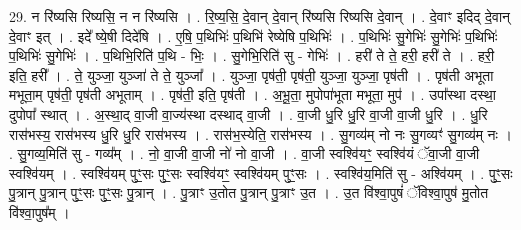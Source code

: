\documentclass[17pt]{extarticle}
\begin{document}
29. न रि॑ष्यसि रिष्यसि॒ न न रि॑ष्यसि । . रि॒ष्य॒सि॒ दे॒वान् दे॒वान् रि॑ष्यसि रिष्यसि दे॒वान् । . दे॒वाꣳ इदिद् दे॒वान् दे॒वाꣳ इत् । . इदे᳚ ष्ये॒षी दिदे॑षि । . ए॒षि॒ प॒थिभिः॑ प॒थिभि॑ रेष्येषि प॒थिभिः॑ । . प॒थिभिः॑ सु॒गेभिः॑ सु॒गेभिः॑ प॒थिभिः॑ प॒थिभिः॑ सु॒गेभिः॑ । . प॒थिभि॒रिति॑ प॒थि - भिः॒ । . सु॒गेभि॒रिति॑ सु - गेभिः॑ । . हरी॑ ते ते॒ हरी॒ हरी॑ ते । . हरी॒ इति॒ हरी᳚ । . ते॒ युञ्जा॒ युञ्जा॑ ते ते॒ युञ्जा᳚ । . युञ्जा॒ पृष॑ती॒ पृष॑ती॒ युञ्जा॒ युञ्जा॒ पृष॑ती । . पृष॑ती अभूता मभूता॒म् पृष॑ती॒ पृष॑ती अभूताम् । . पृष॑ती॒ इति॒ पृष॑ती । . अ॒भू॒ता॒ मुपोपा॑भूता मभूता॒ मुप॑ । . उपा᳚स्था दस्था॒ दुपोपा᳚ स्थात् । . अ॒स्था॒द् वा॒जी वा॒ज्य॑स्था दस्थाद् वा॒जी । . वा॒जी धु॒रि धु॒रि वा॒जी वा॒जी धु॒रि । . धु॒रि रास॑भस्य॒ रास॑भस्य धु॒रि धु॒रि रास॑भस्य । . रास॑भ॒स्येति॒ रास॑भस्य । . सु॒गव्य॑म् नो नः सु॒गव्यꣳ॑ सु॒गव्य॑म् नः । . सु॒गव्य॒मिति॑ सु - गव्य᳚म् । . नो॒ वा॒जी वा॒जी नो॑ नो वा॒जी । . वा॒जी स्वश्वि॑यꣳ॒॒ स्वश्वि॑यं ॅवा॒जी वा॒जी स्वश्वि॑यम् । . स्वश्वि॑यम् पुꣳ॒॒सः पुꣳ॒॒सः स्वश्वि॑यꣳ॒॒ स्वश्वि॑यम् पुꣳ॒॒सः । . स्वश्वि॑य॒मिति॑ सु - अश्वि॑यम् । . पुꣳ॒॒सः पु॒त्रान् पु॒त्रान् पुꣳ॒॒सः पुꣳ॒॒सः पु॒त्रान् । . पु॒त्राꣳ उ॒तोत पु॒त्रान् पु॒त्राꣳ उ॒त । . उ॒त वि॑श्वा॒पुषं॑ ॅविश्वा॒पुष॑ मु॒तोत वि॑श्वा॒पुष᳚म् । \newline
\end{document}
